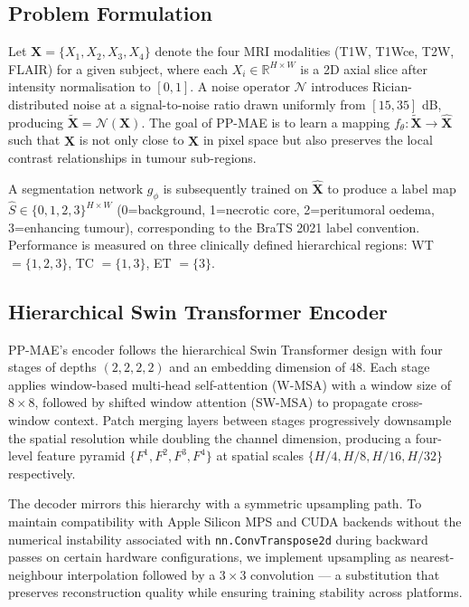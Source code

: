 \documentclass[conference]{IEEEtran}
\begin{document}
\subsection{Problem Formulation}

Let $\mathbf{X} = \{X_1, X_2, X_3, X_4\}$ denote the four MRI
modalities (T1W, T1Wce, T2W, FLAIR) for a given subject, where
each $X_i \in \mathbb{R}^{H \times W}$ is a 2D axial slice after
intensity normalisation to $[0, 1]$. A noise operator
$\mathcal{N}$ introduces Rician-distributed noise at a
signal-to-noise ratio drawn uniformly from $[15, 35]$ dB,
producing $\tilde{\mathbf{X}} = \mathcal{N}(\mathbf{X})$. The goal
of PP-MAE is to learn a mapping $f_\theta: \tilde{\mathbf{X}}
\rightarrow \hat{\mathbf{X}}$ such that $\hat{\mathbf{X}}$ is
not only close to $\mathbf{X}$ in pixel space but also preserves
the local contrast relationships in tumour sub-regions.

A segmentation network $g_\phi$ is subsequently trained on
$\hat{\mathbf{X}}$ to produce a label map
$\hat{S} \in \{0,1,2,3\}^{H \times W}$ (0=background, 1=necrotic
core, 2=peritumoral oedema, 3=enhancing tumour), corresponding
to the BraTS 2021 label convention. Performance is measured on
three clinically defined hierarchical regions: WT $= \{1,2,3\}$,
TC $= \{1,3\}$, ET $= \{3\}$.

\subsection{Hierarchical Swin Transformer Encoder}

PP-MAE's encoder follows the hierarchical Swin Transformer design
\cite{liu2021swin} with four stages of depths $(2, 2, 2, 2)$ and
an embedding dimension of 48. Each stage applies window-based
multi-head self-attention (W-MSA) with a window size of $8 \times 8$,
followed by shifted window attention (SW-MSA) to propagate
cross-window context. Patch merging layers between stages
progressively downsample the spatial resolution while doubling
the channel dimension, producing a four-level feature pyramid
$\{F^1, F^2, F^3, F^4\}$ at spatial scales
$\{H/4, H/8, H/16, H/32\}$ respectively.

The decoder mirrors this hierarchy with a symmetric upsampling path.
To maintain compatibility with Apple Silicon MPS and CUDA backends
without the numerical instability associated with
\texttt{nn.ConvTranspose2d} during backward passes on certain
hardware configurations, we implement upsampling as nearest-neighbour
interpolation followed by a $3 \times 3$ convolution — a
substitution that preserves reconstruction quality while ensuring
training stability across platforms.
\end{document}
